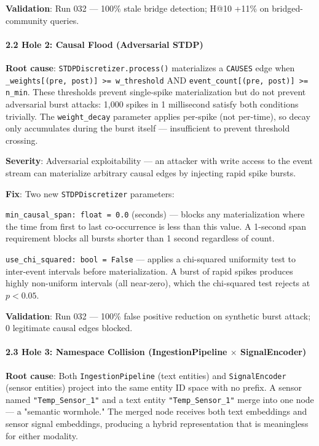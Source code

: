\textbf{Validation}: Run 032 — 100\% stale bridge detection; H@10 +11\% on bridged-community queries.

\paragraph{2.2 Hole 2: Causal Flood (Adversarial STDP)}

\textbf{Root cause}: \texttt{STDPDiscretizer.process()} mater\-ializes a \texttt{CAUSES} edge when \texttt{\_weights[(pre, post)] \textgreater = w\_threshold} AND \texttt{event\_count[(pre, post)] \textgreater = n\_min}. These thresholds prevent single-spike mater\-ialization but do not prevent adversarial burst attacks: 1,000 spikes in 1 millisecond satisfy both conditions trivially. The \texttt{weight\_decay} parameter applies per-spike (not per-time), so decay only accumulates during the burst itself — insuf\-ficient to prevent threshold crossing.

\textbf{Severity}: Adversarial explo\-itability — an attacker with write access to the event stream can materialize arbitrary causal edges by injecting rapid spike bursts.

\textbf{Fix}: Two new \texttt{STDPDiscretizer} parameters:

\texttt{min\_causal\_span: float = 0.0} (seconds) — blocks any mater\-ialization where the time from first to last co-occurrence is less than this value. A 1-second span requirement blocks all bursts shorter than 1 second regardless of count.

\texttt{use\_chi\_squared: bool = False} — applies a chi-squared uniformity test to inter-event intervals before mater\-ialization. A burst of rapid spikes produces highly non-uniform intervals (all near-zero), which the chi-squared test rejects at $p < 0.05$.

\textbf{Validation}: Run 032 — 100\% false positive reduction on synthetic burst attack; 0 legitimate causal edges blocked.

\paragraph{2.3 Hole 3: Namespace Collision (IngestionPipeline $\times$ SignalEncoder)}

\textbf{Root cause}: Both \texttt{IngestionPipeline} (text entities) and \texttt{SignalEncoder} (sensor entities) project into the same entity ID space with no prefix. A sensor named \texttt{"Temp\_Sensor\_1"} and a text entity \texttt{"Temp\_Sensor\_1"} merge into one node — a "semantic wormhole." The merged node receives both text embeddings and sensor signal embeddings, producing a hybrid repre\-sentation that is meaningless for either modality.

